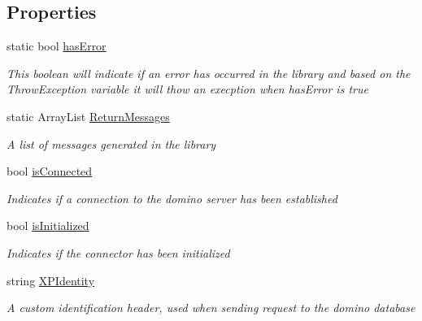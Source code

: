 \subsection*{Properties}
\begin{DoxyCompactItemize}
\item 
static bool \mbox{\hyperlink{class_connector_a079bae21a5417efa53bfe8954c0f533f}{has\+Error}}
\begin{DoxyCompactList}\small\item\em This boolean will indicate if an error has occurred in the library and based on the Throw\+Exception variable it will thow an execption when has\+Error is true \end{DoxyCompactList}\item 
static Array\+List \mbox{\hyperlink{class_connector_a1ed422674b344524fd77998dcf6a9ba6}{Return\+Messages}}
\begin{DoxyCompactList}\small\item\em A list of messages generated in the library \end{DoxyCompactList}\item 
bool \mbox{\hyperlink{class_connector_acf2c3b519c360d02ed54543a01d199af}{is\+Connected}}
\begin{DoxyCompactList}\small\item\em Indicates if a connection to the domino server has been established \end{DoxyCompactList}\item 
bool \mbox{\hyperlink{class_connector_a017d40b1f4cf2cbaa5d4b755cf09269e}{is\+Initialized}}
\begin{DoxyCompactList}\small\item\em Indicates if the connector has been initialized \end{DoxyCompactList}\item 
string \mbox{\hyperlink{class_connector_a092e3e36f92c129c07c57df9b8fb91ca}{X\+P\+Identity}}
\begin{DoxyCompactList}\small\item\em A custom identification header, used when sending request to the domino database \end{DoxyCompactList}\item 

\end{DoxyCompactItemize}
